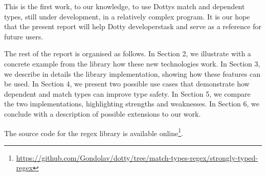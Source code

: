 This is the first work, to our  knowledge, to use Dotty\textquotesingle s match and dependent types, still under development, in a relatively complex program. It is our hope that the present report will help Dotty developers\textquotesingle \space task and serve as a reference for future users.

The rest of the report is organised as follows. In Section 2, we illustrate with a concrete example from the library how these new technologies work. In Section 3, we describe in details the library implementation, showing how these features can be used. In Section 4, we present two possible use cases that demonstrate how dependent and match types can improve type safety. In Section 5, we compare the two implementations, highlighting strengths and weaknesses. In Section 6, we conclude with a description of possible extensions to our  work.

The source code for the regex library is available online\footnote{\url{https://github.com/Gondolav/dotty/tree/match-types-regex/strongly-typed-regex}}.
